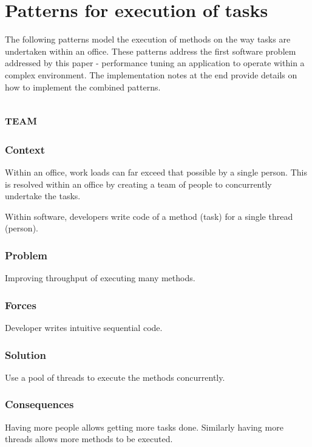 \documentclass[prodmode]{style/acmlarge}
\begin{document}
\section{Patterns for execution of tasks}

The following patterns model the execution of methods on the way tasks are
undertaken within an office.  These patterns address the first software problem
addressed by this paper - performance tuning an application to operate within a
complex environment.  The implementation notes at the end provide details on how
to implement the combined patterns.


\subsection{\textsc{\textbf{team}}}

\subsubsection*{Context} Within an office, work loads can far exceed that
possible by a single person. This is resolved within an office by creating a
team of people to concurrently undertake the tasks.

Within software, developers write code of a method (task) for a single thread
(person).

\subsubsection*{\textbf{Problem}} Improving throughput of executing many methods.

\subsubsection*{Forces} Developer writes intuitive sequential code.

\subsubsection*{\textbf{Solution}} Use a pool of threads to execute the methods
concurrently.

\subsubsection*{Consequences} Having more people allows getting more tasks done.
Similarly having more threads allows more methods to be executed.
\end{document}
